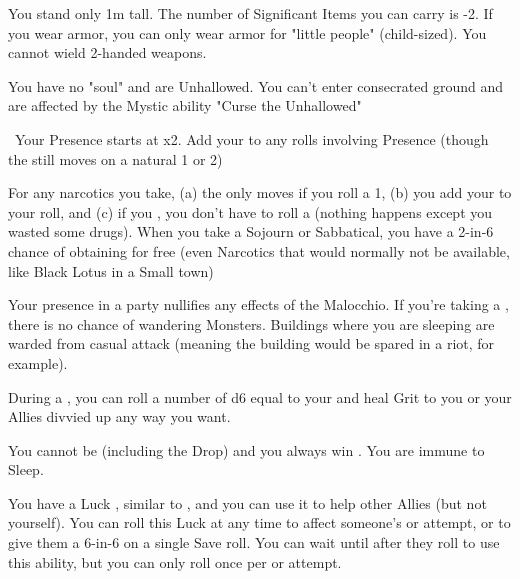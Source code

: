 {  
  You stand only 1m tall.  The number of Significant Items you can carry is -2. If you wear armor, you can only wear armor for "little people" (child-sized).  You cannot wield 2-handed weapons.

  You have no "soul" and are Unhallowed. You can't enter consecrated ground and are affected by the Mystic ability "Curse the Unhallowed"

  \
  Your Presence starts at \DCUP x2.  Add your \LVL to any rolls involving Presence (though the \UD still moves \DCDOWN on a natural 1 or 2)



  For any narcotics you take, (a) the \UD only moves \DCDOWN if you roll a 1, (b) you add your \LVL to your  roll, and (c) if you , you don't have to roll a  (nothing happens except you wasted some drugs).  When you take a Sojourn or Sabbatical, you have a 2-in-6 chance of obtaining   for free (even Narcotics that would normally not be available, like Black Lotus in a Small town)

  Your presence in a party nullifies any effects of the Malocchio.  If you're taking a , there is no chance of wandering Monsters. Buildings where you are sleeping are warded from casual attack (meaning the building would be spared in a riot, for example). 

  During a , you can roll a number of d6 equal to your \LVL and heal \SUM Grit to you or your Allies divvied up any way you want.  

  You cannot be  (including the Drop) and you always win .  You are immune to Sleep.

  You have a Luck \UD, similar to , and you can use it to help other Allies (but not yourself).  You can roll this Luck \UD at any time to affect someone's \RO or \RB attempt, or to give them a 6-in-6 on a single Save roll.  You can wait until after they roll to use this ability, but you can only roll once per \RO or \RB attempt.

}
